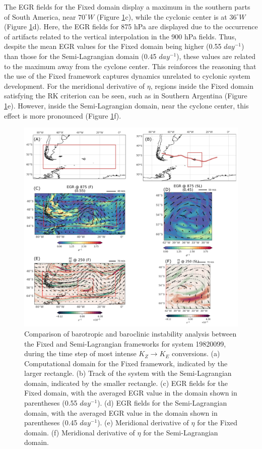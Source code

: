 The EGR fields for the Fixed domain display a maximum in the southern parts of South America, near $70^\circ W$ (Figure \ref{fig:panel_compare_fixed_sl}c), while the cyclonic center is at $36^\circ W$ (Figure \ref{fig:panel_compare_fixed_sl}d). Here, the EGR fields for 875 hPa are displayed due to the occurrence of artifacts related to the vertical interpolation in the 900 hPa fields. Thus, despite the mean EGR values for the Fixed domain being higher (0.55 $day^{-1}$) than those for the Semi-Lagrangian domain (0.45 $day^{-1}$), these values are related to the maximum away from the cyclone center. This reinforces the reasoning that the use of the Fixed framework captures dynamics unrelated to cyclonic system development. For the meridional derivative of $\eta$, regions inside the Fixed domain satisfying the RK criterion can be seen, such as in Southern Argentina (Figure \ref{fig:panel_compare_fixed_sl}e). However, inside the Semi-Lagrangian domain, near the cyclone center, this effect is more pronounced (Figure \ref{fig:panel_compare_fixed_sl}f).

\begin{figure}[!htbp]
    \centering
    \includegraphics[width=\textwidth]{figs_6/panel_compare_fixed_sl.pdf}
    \caption[Comparative Analysis]{Comparison of barotropic and baroclinic instability analysis between the Fixed and Semi-Lagrangian frameworks for system 19820099, during the time step of most intense $K_Z \rightarrow K_E$ conversions. (a) Computational domain for the Fixed framework, indicated by the larger rectangle. (b) Track of the system with the Semi-Lagrangian domain, indicated by the smaller rectangle. (c) EGR fields for the Fixed domain, with the averaged EGR value in the domain shown in parentheses (0.55 $day^{-1}$). (d) EGR fields for the Semi-Lagrangian domain, with the averaged EGR value in the domain shown in parentheses (0.45 $day^{-1}$). (e) Meridional derivative of $\eta$ for the Fixed domain. (f) Meridional derivative of $\eta$ for the Semi-Lagrangian domain.}
    \label{fig:panel_compare_fixed_sl}
\end{figure}


